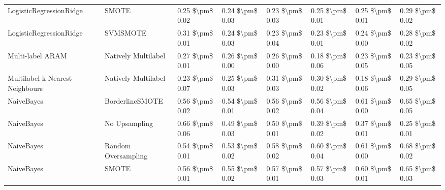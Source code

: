\begin{tabular}{llllllll}
        LogisticRegressionRidge &                         SMOTE &     0.25 \$\textbackslash pm\$ 0.02 &           0.24 \$\textbackslash pm\$ 0.03 &       0.23 \$\textbackslash pm\$ 0.03 &        0.25 \$\textbackslash pm\$ 0.01 &                         0.25 \$\textbackslash pm\$ 0.01 & 0.29 \$\textbackslash pm\$ 0.02 \\
        LogisticRegressionRidge &                      SVMSMOTE &     0.31 \$\textbackslash pm\$ 0.01 &           0.24 \$\textbackslash pm\$ 0.03 &       0.23 \$\textbackslash pm\$ 0.04 &        0.23 \$\textbackslash pm\$ 0.01 &                         0.24 \$\textbackslash pm\$ 0.00 & 0.28 \$\textbackslash pm\$ 0.02 \\
               Multi-label ARAM &           Natively Multilabel &     0.27 \$\textbackslash pm\$ 0.01 &           0.26 \$\textbackslash pm\$ 0.00 &       0.26 \$\textbackslash pm\$ 0.00 &        0.18 \$\textbackslash pm\$ 0.06 &                         0.23 \$\textbackslash pm\$ 0.05 & 0.23 \$\textbackslash pm\$ 0.05 \\
Multilabel k Nearest Neighbours &           Natively Multilabel &     0.23 \$\textbackslash pm\$ 0.07 &           0.25 \$\textbackslash pm\$ 0.03 &       0.31 \$\textbackslash pm\$ 0.03 &        0.30 \$\textbackslash pm\$ 0.02 &                         0.18 \$\textbackslash pm\$ 0.06 & 0.29 \$\textbackslash pm\$ 0.05 \\
                     NaiveBayes &               BorderlineSMOTE &     0.56 \$\textbackslash pm\$ 0.02 &           0.54 \$\textbackslash pm\$ 0.01 &       0.56 \$\textbackslash pm\$ 0.02 &        0.56 \$\textbackslash pm\$ 0.04 &                         0.61 \$\textbackslash pm\$ 0.00 & 0.65 \$\textbackslash pm\$ 0.05 \\
                     NaiveBayes &                 No Upsampling &     0.66 \$\textbackslash pm\$ 0.06 &           0.49 \$\textbackslash pm\$ 0.03 &       0.50 \$\textbackslash pm\$ 0.01 &        0.39 \$\textbackslash pm\$ 0.02 &                         0.37 \$\textbackslash pm\$ 0.01 & 0.25 \$\textbackslash pm\$ 0.01 \\
                     NaiveBayes &           Random Oversampling &     0.54 \$\textbackslash pm\$ 0.01 &           0.53 \$\textbackslash pm\$ 0.02 &       0.58 \$\textbackslash pm\$ 0.02 &        0.60 \$\textbackslash pm\$ 0.04 &                         0.61 \$\textbackslash pm\$ 0.00 & 0.68 \$\textbackslash pm\$ 0.02 \\
                     NaiveBayes &                         SMOTE &     0.56 \$\textbackslash pm\$ 0.01 &           0.55 \$\textbackslash pm\$ 0.02 &       0.57 \$\textbackslash pm\$ 0.01 &        0.57 \$\textbackslash pm\$ 0.03 &                         0.60 \$\textbackslash pm\$ 0.01 & 0.65 \$\textbackslash pm\$ 0.03 \\

\end{tabular}
